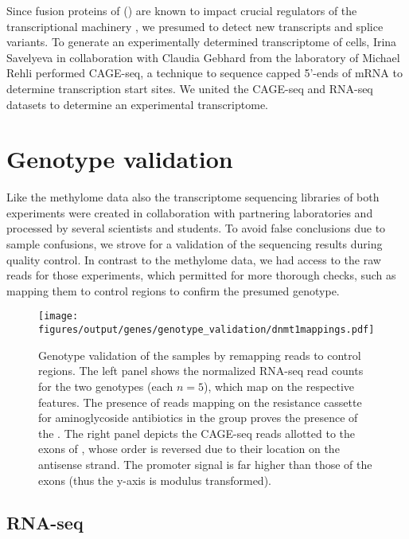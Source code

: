 Since fusion proteins of  (\mllfp) are known to impact crucial regulators of the transcriptional machinery \cite{Slany2016}, we presumed to detect new transcripts and splice variants. To generate an experimentally determined transcriptome of \mllafnine cells, Irina Savelyeva in collaboration with Claudia Gebhard from the laboratory of Michael Rehli performed CAGE-seq\cite{Carninci1996,Shiraki2003,Takahashi2012}, a technique to sequence capped 5'-ends of mRNA to determine transcription start sites. We united the CAGE-seq and RNA-seq datasets to determine an experimental transcriptome.

\section{Genotype validation}
\label{chap:r:transcription:genotypeval}

Like the methylome data also the transcriptome sequencing libraries of both experiments were created in collaboration with partnering laboratories and processed by several scientists and students. To avoid false conclusions due to sample confusions, we strove for a validation of the sequencing results during quality control. In contrast to the methylome data, we had access to the raw reads for those experiments, which permitted for more thorough checks, such as mapping them to control regions to confirm the presumed genotype.

\begin{figure}[!ht] 
	\centering
	\texttt{[image: figures/output/genes/genotype\_validation/dnmt1mappings.pdf]} 
	\caption{Genotype validation of the samples by remapping reads to control regions. The left panel shows the normalized RNA-seq read counts for the two genotypes (each \ensuremath{n\!= \!5}), which map on the respective features. The presence of reads mapping on the resistance cassette for aminoglycoside antibiotics in the \dnmtchip group proves the presence of the \dnmtcallele. The right panel depicts the CAGE-seq reads allotted to the exons of , whose order is reversed due to their location on the antisense strand. The promoter signal is far higher than those of the exons (thus the y-axis is modulus transformed).}
	\label{fig:genes:genotype_validation}
\end{figure}

\subsection{RNA-seq}
\label{chap:r:transcription:genotypeval:rna}

